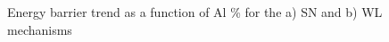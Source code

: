 \documentclass[preprint]{elsarticle}
\begin{document}
\begin{figure}[htp!]%
    \centering
\caption{Energy barrier trend as a function of Al \%  for the a) SN and b) WL mechanisms}
\label{fig:energy_barrier}
  \end{figure}
\end{document}

